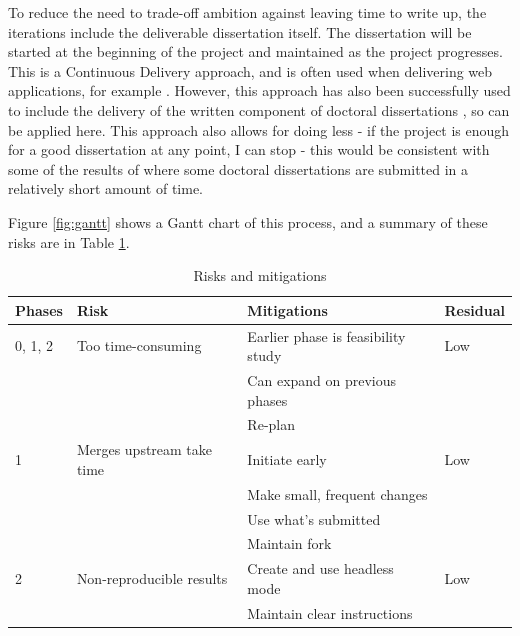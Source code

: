\documentclass[a4paper,11pt]{article}
\begin{document}
To reduce the need to trade-off ambition against leaving time to write up, the iterations include the deliverable dissertation itself. The dissertation will be started at the beginning of the project and maintained as the project progresses. This is a Continuous Delivery approach, and is often used when delivering web applications, for example \cite{chen_continuous_2015}. However, this approach has also been successfully used to include the delivery of the written component of doctoral dissertations \cite{alipui_agile_nodate}, so can be applied here. This approach also allows for doing less - if the project is enough for a good dissertation at any point, I can stop - this would be consistent with some of the results of \cite{alipui_agile_nodate} where some doctoral dissertations are submitted in a relatively short amount of time.

Figure \ref{fig:gantt} shows a Gantt chart of this process, and a summary of these risks are in Table \ref{fig:risks}.

\begin{table}[htbp]
    \begin{center}
        \begin{tabular}{|l|l|l|l|}
        \hline
        \textbf{Phases} & \textbf{Risk} & \textbf{Mitigations} & \textbf{Residual} \\
        \hline
        0, 1, 2 & Too time-consuming        & Earlier phase is feasibility study & Low \\
                &                           & Can expand on previous phases      & \\
                &                           & Re-plan                            & \\
        1       & Merges upstream take time & Initiate early                     & Low \\
                &                           & Make small, frequent changes       & \\
                &                           & Use what's submitted               & \\
                &                           & Maintain fork                      & \\
        2       & Non-reproducible results  & Create and use headless mode       & Low \\
                &                           & Maintain clear instructions        & \\
        \hline
        \end{tabular} 
    \end{center}
    \caption[Risks and mitigations]{Risks and mitigations}
    \label{fig:risks}
\end{table}
\end{document}
